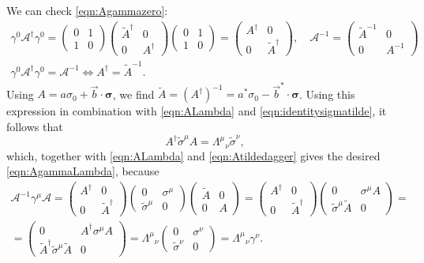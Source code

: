 \documentclass[a4paper,12pt]{book}
\begin{document}
We can check \cref{eqn:Agammazero}:
\begin{gather}
\gamma^0\mathcal A^\dagger\gamma^0=
\begin{pmatrix}0&1\\ 1&0\end{pmatrix}
\begin{pmatrix}\tilde A^\dagger&0\\ 0&A^\dagger\end{pmatrix}
\begin{pmatrix}0&1\\ 1&0\end{pmatrix}=
\begin{pmatrix} A^\dagger&0\\ 0&\tilde A^\dagger\end{pmatrix},
\quad\mathcal A^{-1}=\begin{pmatrix}\tilde A^{-1}&0\\ 0&A^{-1}\end{pmatrix}\nonumber\\
\gamma^0\mathcal A^\dagger\gamma^0=\mathcal A^{-1}\iff A^\dagger=\tilde A^{-1}.
\label{eqn:Atildedagger}
\end{gather}
Using $A=a\sigma_0+\vec b\cdot\boldsymbol\sigma$, we find $\tilde A=(A^\dagger)^{-1}=a^*\sigma_0-\vec b^*\cdot\boldsymbol\sigma$. Using this expression in combination with \cref{eqn:ALambda} and \cref{eqn:identitysigmatilde}, it follows that
\[A^\dagger\tilde\sigma^\mu A=\Lambda^\mu{}_\nu\tilde\sigma^\nu,\]
which, together with \cref{eqn:ALambda} and \cref{eqn:Atildedagger} gives the desired \cref{eqn:AgammaLambda}, because
\begin{multline*}
\mathcal A^{-1}\gamma^\mu\mathcal A=
\begin{pmatrix}A^\dagger&0\\ 0&\tilde A^\dagger\end{pmatrix}
\begin{pmatrix}0&\sigma^\mu\\ \tilde\sigma^\mu&0\end{pmatrix}
\begin{pmatrix}\tilde A&0\\ 0&A\end{pmatrix}=
\begin{pmatrix}A^\dagger&0\\ 0&\tilde A^\dagger\end{pmatrix}
\begin{pmatrix}0&\sigma^\mu A\\ \tilde\sigma^\mu \tilde A&0\end{pmatrix}=\\
=\begin{pmatrix}0&A^\dagger\sigma^\mu A\\ \tilde A^\dagger\tilde\sigma^\mu\tilde A&0\end{pmatrix}=
\Lambda^\mu{}_\nu\begin{pmatrix}0&\sigma^\nu\\ \tilde\sigma^\nu&0\end{pmatrix}=\Lambda^\mu{}_\nu\gamma^\nu.
\end{multline*}
\end{document}
